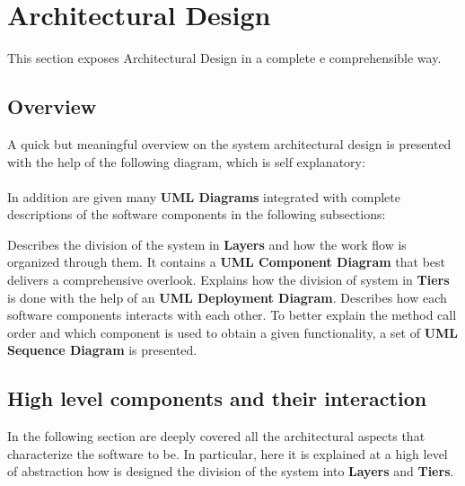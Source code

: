 \section{Architectural Design}
This section exposes \myTaxiService{} Architectural Design in a complete e comprehensible way.
%
\subsection{Overview}
A quick but meaningful overview on the system architectural design is presented with the help of the following diagram, which is self explanatory:\\
\\
In addition are given many \textbf{UML Diagrams} integrated with complete descriptions of the software components in the following subsections:
\begin{itemize}
	 Describes the division of the system in \textbf{Layers} and how the work flow is organized through them.
		It contains a \textbf{UML Component Diagram} that best delivers a comprehensive overlook.
	 Explains how the division of system in \textbf{Tiers} is done with the help of an \textbf{UML Deployment Diagram}.
	 Describes how each software components interacts with each other.
		To better explain the method call order and which component is used to obtain a given functionality, a set of \textbf{UML Sequence Diagram} is presented.
\end{itemize}
%
\subsection{High level components and their interaction}
In the following section are deeply covered all the architectural aspects that characterize the software to be.
In particular, here it is explained at a high level of abstraction how is designed the division of the system into \textbf{Layers} and \textbf{Tiers}.
%
